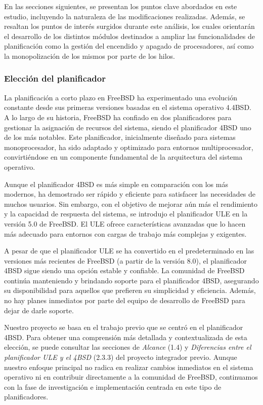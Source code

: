 En las secciones siguientes, se presentan los puntos clave abordados en este estudio, incluyendo la naturaleza de las modificaciones realizadas. Además, se resaltan los puntos de interés surgidos durante este análisis, los cuales orientarán el desarrollo de los distintos módulos destinados a ampliar las funcionalidades de planificación como la gestión del encendido y apagado de procesadores, así como la monopolización de los mismos por parte de los hilos.\par

\subsubsection{Elección del planificador}

La planificación a corto plazo en FreeBSD ha experimentado una evolución constante desde sus primeras versiones basadas en el sistema operativo 4.4BSD\cite{bib3}. A lo largo de su historia, FreeBSD ha confiado en dos planificadores para gestionar la asignación de recursos del sistema, siendo el planificador 4BSD uno de los más notables. Este planificador, inicialmente diseñado para sistemas monoprocesador, ha sido adaptado y optimizado para entornos multiprocesador, convirtiéndose en un componente fundamental de la arquitectura del sistema operativo.\par

Aunque el planificador 4BSD es más simple en comparación con los más modernos, ha demostrado ser rápido y eficiente para satisfacer las necesidades de muchos usuarios. Sin embargo, con el objetivo de mejorar aún más el rendimiento y la capacidad de respuesta del sistema, se introdujo el planificador ULE en la versión 5.0 de FreeBSD. El ULE ofrece características avanzadas que lo hacen más adecuado para entornos con cargas de trabajo más complejas y exigentes.\par

A pesar de que el planificador ULE se ha convertido en el predeterminado en las versiones más recientes de FreeBSD (a partir de la versión 8.0), el planificador 4BSD sigue siendo una opción estable y confiable. La comunidad de FreeBSD continúa manteniendo y brindando soporte para el planificador 4BSD, asegurando su disponibilidad para aquellos que prefieren su simplicidad y eficiencia. Además, no hay planes inmediatos por parte del equipo de desarrollo de FreeBSD para dejar de darle soporte.\par

Nuestro proyecto se basa en el trabajo previo que se centró en el planificador 4BSD. Para obtener una comprensión más detallada y contextualizada de esta elección, se puede consultar las secciones de \textit{Alcance} (1.4) y  \textit{Diferencias entre el planificador ULE y el 4BSD} (2.3.3) del proyecto integrador previo\cite{bib1}. Aunque nuestro enfoque principal no radica en realizar cambios inmediatos en el sistema operativo ni en contribuir directamente a la comunidad de FreeBSD, continuamos con la fase de investigación e implementación centrada en este tipo de planificadores.\par


